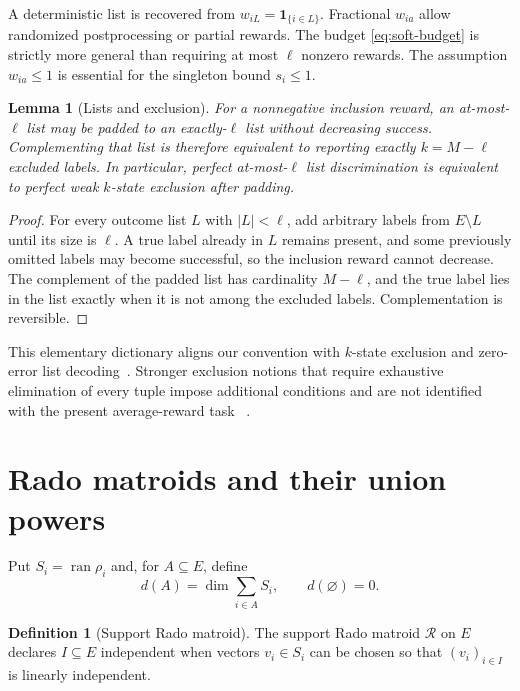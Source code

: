\documentclass[11pt]{article}
\newtheorem{lemma}[theorem]{Lemma}
\theoremstyle{definition}
\newtheorem{definition}[theorem]{Definition}
\theoremstyle{remark}
\newcommand{\cR}{\mathcal R}
\newcommand{\ran}{\operatorname{ran}}
\begin{document}
A deterministic list is recovered from $w_{iL}=\bm1_{\{i\in L\}}$.
Fractional $w_{ia}$ allow randomized postprocessing or partial rewards.  The
budget \eqref{eq:soft-budget} is strictly more general than requiring at most
$\ell$ nonzero rewards.  The assumption $w_{ia}\leq1$ is essential for the
singleton bound $s_i\leq1$.

\begin{lemma}[Lists and exclusion]\label{lem:padding}
For a nonnegative inclusion reward, an at-most-$\ell$ list may be padded to
an exactly-$\ell$ list without decreasing success.  Complementing that list
is therefore equivalent to reporting exactly $k=M-\ell$ excluded labels.
In particular, perfect at-most-$\ell$ list discrimination is equivalent to
perfect weak $k$-state exclusion after padding.
\end{lemma}

\begin{proof}
For every outcome list $L$ with $|L|<\ell$, add arbitrary labels from
$E\setminus L$ until its size is $\ell$.  A true label already in $L$ remains
present, and some previously omitted labels may become successful, so the
inclusion reward cannot decrease.  The complement of the padded list has
cardinality $M-\ell$, and the true label lies in the list exactly when it is
not among the excluded labels.  Complementation is reversible.
\end{proof}

This elementary dictionary aligns our convention with $k$-state exclusion
and zero-error list decoding~\cite{stratton2024,dalai2026}.  Stronger exclusion
notions that require exhaustive elimination of every tuple impose additional
conditions and are not identified with the present average-reward task
~\cite{manna2026}.

\section{Rado matroids and their union powers}\label{sec:matroid}

Put $S_i=\ran\rho_i$ and, for $A\subseteq E$, define
\begin{equation}\label{eq:d}
 d(A)=\dim\sum_{i\in A}S_i,\qquad d(\varnothing)=0.
\end{equation}

\begin{definition}[Support Rado matroid]
The support Rado matroid $\cR$ on $E$ declares $I\subseteq E$ independent
when vectors $v_i\in S_i$ can be chosen so that $(v_i)_{i\in I}$ is linearly
independent.
\end{definition}
\end{document}
